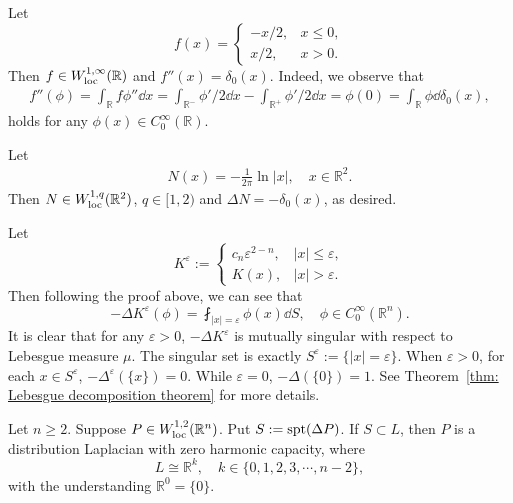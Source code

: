 \begin{remark}
  Let 
  \begin{equation*}
    f(x) = 
    \begin{cases}
      -x/2, & x\leq 0,\\
      x/2, & x>0.
    \end{cases}
  \end{equation*}
  Then $f\in W_{\operatorname*{loc}}^{1,\infty}(\mathbb R)$ and $f''(x) = \delta_0(x)$.
  Indeed,
  we observe that 
  \begin{align*}
    f''(\phi) = \int_{\mathbb R}  f\phi''\dd x 
    = \int_{\mathbb R^-}  \phi'/2\dd x - \int_{\mathbb R^+}\phi'/2\dd x 
    = \phi(0) = \int_{\mathbb R}\phi\dd\delta_0(x),
  \end{align*}
  holds for any $\phi(x)\in C^\infty_0(\mathbb R)$.
\end{remark}

\begin{remark}
Let 
  \begin{align*}
    N(x) = -\frac{1}{2\pi}\ln|x|,\quad x\in\mathbb R^2.
  \end{align*}
Then $N\in W^{1,q}_{\operatorname*{loc}}(\mathbb R^2)$, $q\in[1,2)$ and $\Delta N = -\delta_0(x)$,
as desired.
\end{remark}

\begin{remark}
  Let 
  \[
  K^\varepsilon := 
  \begin{cases}
    c_n\varepsilon^{2-n}, & |x|\leq\varepsilon,\\
    K(x), & |x|>\varepsilon.
  \end{cases}
  \]
  Then following the proof above, we can see that 
  \[
  -\Delta K^\varepsilon(\phi) = \fint_{|x|=\varepsilon}\phi(x)\dd S,\quad \phi\in C_0^\infty(\mathbb R^n).
  \] 
  It is clear that for any $\varepsilon>0$,
  $-\Delta K^\varepsilon$ is mutually singular with respect to Lebesgue measure $\mu$.
  The singular set is exactly $S^\varepsilon := \{|x|=\varepsilon\}$.
  When $\varepsilon>0$, for each $x\in S^\varepsilon$, $-\Delta^\varepsilon(\{x\}) = 0$.
  While $\varepsilon = 0$, $-\Delta(\{0\}) = 1$. 
  See Theorem~\ref{thm: Lebesgue decomposition theorem} for more details.
\end{remark}

\begin{proposition}
  Let $n\geq2$. 
  Suppose $P\in W_{\operatorname*{loc}}^{1,2}(\mathbb R^n)$.
  Put $S:= \operatorname*{spt}(\Delta P)$.
  If $S\subset L$, 
  then $P$ is a distribution Laplacian with zero harmonic capacity,
  where
  \[
  L\cong \mathbb{R}^k,\quad k\in\{0,1,2,3,\cdots, n-2\},
  \]
  with the understanding $\mathbb R^0=\{0\}$.
\end{proposition}

